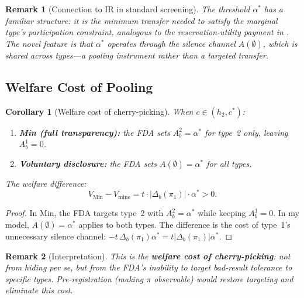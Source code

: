 \documentclass[12pt,a4paper]{article}
\newtheorem{remark}{Remark}
\newtheorem{corollary}{Corollary}
\begin{document}
\begin{remark}[Connection to IR in standard screening]
The threshold $\alpha^*$ has a familiar structure: it is the
\emph{minimum transfer} needed to satisfy the marginal type's
participation constraint, analogous to the reservation-utility
payment in \citet{mussarosen1978}. The novel feature is that
$\alpha^*$ operates through the \emph{silence channel}
$A(\emptyset)$, which is shared across types---a pooling
instrument rather than a targeted transfer.
\end{remark}


\subsection{Welfare Cost of Pooling}
\label{sec:welfare}

\begin{corollary}[Welfare cost of cherry-picking]
\label{cor:welfare}
When $c \in (h_2, c^*)$:
\begin{enumerate}
  \item[(i)] \textbf{Min (full transparency):} the FDA sets
    $A_b^2 = \alpha^*$ for type~2 only, leaving $A_b^1 = 0$.
  \item[(ii)] \textbf{Voluntary disclosure:} the FDA sets
    $A(\emptyset) = \alpha^*$ for all types.
\end{enumerate}
The welfare difference:
\begin{equation}\label{eq:welfare_cost}
  V_{\text{Min}} - V_{\text{mine}}
  = t \cdot |\Delta_b(\pi_1)| \cdot \alpha^* > 0.
\end{equation}
\end{corollary}

\begin{proof}
In Min, the FDA targets type~2 with $A_b^2 = \alpha^*$ while
keeping $A_b^1 = 0$. In my model, $A(\emptyset) = \alpha^*$
applies to both types. The difference is the cost of type~1's
unnecessary silence channel:
$-t \, \Delta_b(\pi_1) \alpha^*
= t |\Delta_b(\pi_1)| \alpha^*$.
\end{proof}

\begin{remark}[Interpretation]
This is the \textbf{welfare cost of cherry-picking}: not from
hiding per se, but from the FDA's inability to target
bad-result tolerance to specific types. Pre-registration
(making $\pi$ observable) would restore targeting and
eliminate this cost.
\end{remark}


\end{document}
